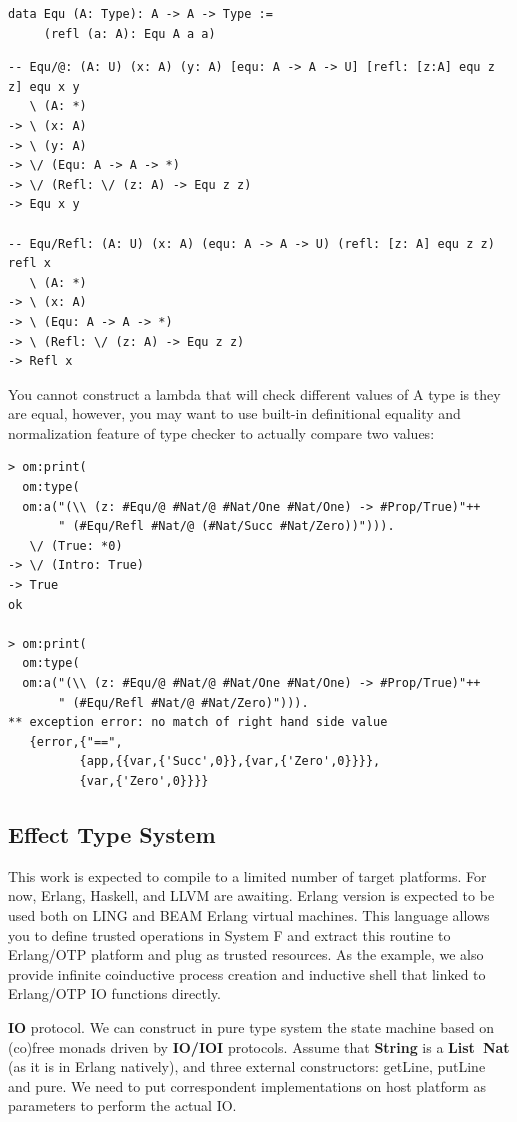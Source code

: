 \documentclass{aip-cp}
\begin{document}
\begin{lstlisting}
data Equ (A: Type): A -> A -> Type :=
     (refl (a: A): Equ A a a)
\end{lstlisting}

\begin{lstlisting}
-- Equ/@: (A: U) (x: A) (y: A) [equ: A -> A -> U] [refl: [z:A] equ z z] equ x y
   \ (A: *)
-> \ (x: A)
-> \ (y: A)
-> \/ (Equ: A -> A -> *)
-> \/ (Refl: \/ (z: A) -> Equ z z)
-> Equ x y

-- Equ/Refl: (A: U) (x: A) (equ: A -> A -> U) (refl: [z: A] equ z z) refl x
   \ (A: *)
-> \ (x: A)
-> \ (Equ: A -> A -> *)
-> \ (Refl: \/ (z: A) -> Equ z z)
-> Refl x
\end{lstlisting}

You cannot construct a lambda that will check different values of A type is they are equal,
however, you may want to use built-in definitional equality and
normalization feature of type checker to actually compare two values:

\begin{lstlisting}[mathescape=true]
> om:print(
  om:type(
  om:a("(\\ (z: #Equ/@ #Nat/@ #Nat/One #Nat/One) -> #Prop/True)"++
       " (#Equ/Refl #Nat/@ (#Nat/Succ #Nat/Zero))"))).
   \/ (True: *0)
-> \/ (Intro: True)
-> True
ok

> om:print(
  om:type(
  om:a("(\\ (z: #Equ/@ #Nat/@ #Nat/One #Nat/One) -> #Prop/True)"++
       " (#Equ/Refl #Nat/@ #Nat/Zero)"))).
** exception error: no match of right hand side value
   {error,{"==",
          {app,{{var,{'Succ',0}},{var,{'Zero',0}}}},
          {var,{'Zero',0}}}}
\end{lstlisting}

\subsection{Effect Type System}
This work is expected to compile to a limited number of target platforms. For now, Erlang, Haskell, and LLVM are awaiting.
Erlang version is expected to be used both on LING and BEAM Erlang virtual machines. This language
allows you to define trusted operations in System F and extract this routine to Erlang/OTP platform
and plug as trusted resources. As the example, we also provide infinite coinductive process creation
and inductive shell that linked to Erlang/OTP IO functions directly.

{\bf IO} protocol. We can construct in pure type system the state machine based on (co)free
monads driven by {\bf IO/IOI} protocols. Assume that {\bf String} is a {\bf List\ Nat}
(as it is in Erlang natively), and three external constructors: getLine, putLine and pure.
We need to put correspondent implementations on host platform as parameters
to perform the actual IO.
\end{document}
